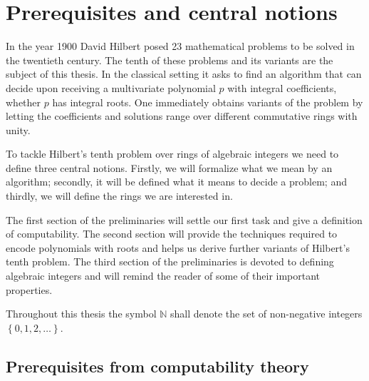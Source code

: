 \documentclass[12pt,
               a4paper,
               numbers=noenddot,
               final]{scrbook}
\numberwithin{equation}{section}
\newcommand{\set}[1]{\left\lbrace #1 \right\rbrace}
\begin{document}


\allowdisplaybreaks

\frontmatter



\mainmatter

\chapter{Prerequisites and central notions}

In the year 1900 David Hilbert posed 23 mathematical problems to be solved in
the twentieth century. The tenth of these problems and its variants are the
subject of this thesis. In the classical setting it asks to find an algorithm
that can decide upon receiving a multivariate polynomial \(p\) with integral
coefficients, whether \(p\) has integral roots. One immediately obtains variants
of the problem by letting the coefficients and solutions range over different
commutative rings with unity.

To tackle Hilbert's tenth problem over rings of algebraic integers we need to
define three central notions. Firstly, we will formalize what we mean by an
algorithm; secondly, it will be defined what it means to decide a problem; and
thirdly, we will define the rings we are interested in.

The first section of the preliminaries will settle our first task and give a
definition of computability. The second section will provide the techniques
required to encode polynomials with roots and helps us derive further variants
of Hilbert's tenth problem. The third section of the preliminaries is devoted to
defining algebraic integers and will remind the reader of some of their
important properties.

Throughout this thesis the symbol \(ℕ\) shall denote the set of non-negative
integers \(\set{0, 1, 2, …}\).

\section{Prerequisites from computability theory}%
\label{sec:computability theory}

\end{document}
